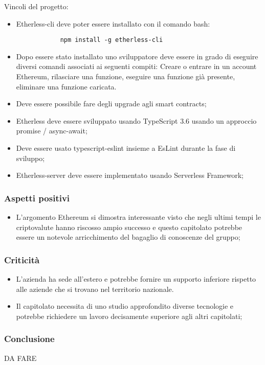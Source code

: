     Vincoli del progetto:
    \begin{itemize}
    		\item Etherless-cli deve poter essere installato con il comando bash:  \begin{verbatim}
    		npm install -g etherless-cli
    		\end{verbatim}
    		\item Dopo essere stato installato uno sviluppatore deve essere in grado di eseguire diversi comandi associati ai seguenti compiti: Creare o entrare in un account Ethereum, rilasciare una funzione, eseguire una funzione già presente, eliminare una funzione caricata.
    		\item Deve essere possibile fare degli upgrade agli smart contracts;
    		\item Etherless deve essere sviluppato usando TypeScript 3.6 usando un approccio  promise / async-await;
    		\item Deve essere usato typescript-eslint insieme a EsLint durante la fase di sviluppo;
    		\item Etherless-server deve essere implementato usando Serverless Framework;
    						
 \end{itemize}
    
    
    \subsubsection{Aspetti positivi}
    \begin{itemize}
    		\item L'argomento Ethereum si dimostra interessante visto che negli ultimi tempi le criptovalute hanno riscosso ampio successo e questo capitolato potrebbe essere un notevole arricchimento del bagaglio di conoscenze del gruppo;
    \end{itemize}
    \subsubsection{Criticità}
    \begin{itemize}
    		\item L'azienda ha sede all'estero e potrebbe fornire un supporto inferiore rispetto alle aziende che si trovano nel territorio nazionale.
    		\item Il capitolato necessita di uno studio approfondito diverse tecnologie e potrebbe richiedere un lavoro decisamente superiore agli altri capitolati;
    \end{itemize}
    \subsubsection{Conclusione}
	DA FARE